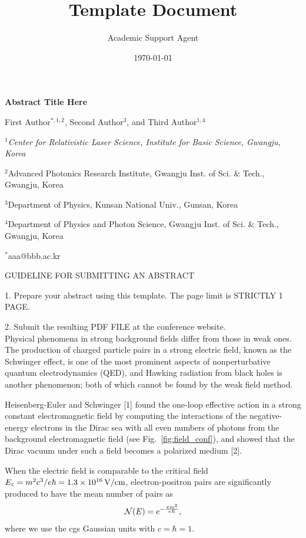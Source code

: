 \documentclass{article}
\title{Template Document}
\author{Academic Support Agent}
\date{\today}
\begin{document}
\maketitle

\begin{center}
	
{\large \bf Abstract Title Here}
\bigskip

{First Author$^{*,1,2}$,
Second Author$^3$, 
and Third Author$^{1,4}$}

\smallskip

{\small\it
$^1$Center for Relativistic Laser Science, Institute for Basic Science, Gwangju, Korea

$^2$Advanced Photonics Research Institute, Gwangju Inst. of Sci. \& Tech., Gwangju, Korea

$^3$Department of Physics, Kunsan National Univ., Gunsan, Korea

$^4$Department of Physics and Photon Science, Gwangju Inst. of Sci. \& Tech., Gwangju, Korea
}

$^*$aaa@bbb.ac.kr

\end{center}

\bigskip

GUIDELINE FOR SUBMITTING AN ABSTRACT

1. Prepare your abstract using this template. The page limit is STRICTLY 1 PAGE.

2. Submit the resulting PDF FILE at the conference website. \\

Physical phenomena in strong background fields differ from those in weak ones. The production of charged particle pairs in a strong electric field, known as the Schwinger effect, is one of the most prominent aspects of nonperturbative quantum electrodynamics (QED), and Hawking radiation from black holes is another phenomenon; both of which cannot be found by the weak field method. 

Heisenberg-Euler and Schwinger [1] found the one-loop effective action in a strong constant electromagnetic field by computing the interactions of the negative-energy electrons in the Dirac sea with all even numbers of photons from the background electromagnetic field (see Fig.~\ref{fig:field_conf}), and showed that the Dirac vacuum under such a field becomes a polarized medium [2].

When the electric field is comparable to the critical field $E_{c} = m^2c^3/e\hbar = 1.3 \times 10^{16}\, {\rm V/cm}$, electron-positron pairs are significantly produced to have the mean number of pairs as
\begin{equation*}
{\cal N} (E) = e^{-\frac{\pi m^2}{eE}},
\end{equation*}
where we use the cgs Gaussian units with $c=\hbar =1$.
\end{document}
